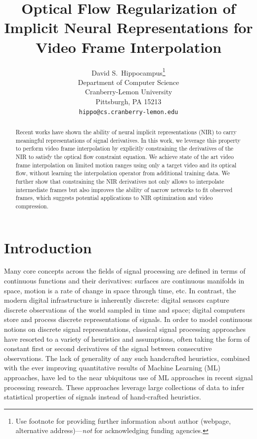 \documentclass{article}
\title{Optical Flow Regularization of Implicit Neural Representations for Video Frame Interpolation}
\author{%
  David S.~Hippocampus\thanks{Use footnote for providing further information
    about author (webpage, alternative address)---\emph{not} for acknowledging
    funding agencies.} \\
  Department of Computer Science\\
  Cranberry-Lemon University\\
  Pittsburgh, PA 15213 \\
  \texttt{hippo@cs.cranberry-lemon.edu} \\
}
\begin{document}
\maketitle


\begin{abstract}
Recent works have shown the ability of neural implicit representations (NIR) to carry meaningful representations of signal derivatives.
In this work, we leverage this property to perform video frame interpolation
by explicitly constraining the derivatives of the NIR to satisfy the optical flow constraint equation.
We achieve state of the art video frame interpolation on limited motion ranges
using only a target video and its optical flow, without learning the interpolation operator from additional training data.
We further show that constraining the NIR derivatives not only
allows to interpolate intermediate frames but also improves the ability of narrow networks to fit observed frames,
which suggests potential applications to NIR optimization and video compression.
\end{abstract}

\section{Introduction}


Many core concepts across the fields of signal processing are defined in terms of continuous functions and their derivatives:
surfaces are continuous manifolds in space,
motion is a rate of change in space through time, etc.
In contrast, the modern digital infrastructure is inherently discrete:
digital sensors capture discrete observations of the world sampled in time and space;
digital computers store and process discrete representations of signals.
In order to model continuous notions on discrete signal representations,
classical signal processing approaches have resorted to a variety of heuristics and assumptions,
often taking the form of constant first or second derivatives of the signal between consecutive observations.
The lack of generality of any such handcrafted heuristics,
combined with the ever improving quantitative results of Machine Learning (ML) approaches,
have led to the near ubiquitous use of ML approaches in recent signal processing research.
These approaches leverage large collections of data to infer statistical properties of signals instead of hand-crafted heuristics.
\end{document}
